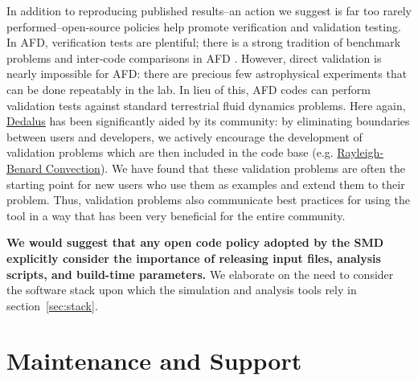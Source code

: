 \documentclass[12pt, titlepage]{aastex62}
\newcommand{\dedalus}{\href{http://dedalus-project.org}{Dedalus}}
\begin{document}

In addition to reproducing published results--an action we suggest is far too rarely performed--open-source policies help promote verification and validation testing. In AFD, verification tests are plentiful; there is a strong tradition of benchmark problems and inter-code comparisons in AFD \citep[e.g.][among many others]{2001JGR...106.3715B,2014GeoJI.197..119M,2014ApJS..210...14K,2016MNRAS.455.4274L}. However, direct validation is nearly impossible for AFD: there are precious few astrophysical experiments that can be done repeatably in the lab. In lieu of this, AFD codes can perform validation tests against standard terrestrial fluid dynamics problems. Here again, \dedalus{} has been significantly aided by its community: by eliminating boundaries between users and developers, we actively encourage the development of validation problems which are then included in the code base (e.g. \href{https://bitbucket.org/dedalus-project/dedalus/src/cf57edf1516b931bc4ad0a7895d06219bbe90414/examples/ivp/3d_rayleigh_benard/rayleigh_benard.py?at=default&fileviewer=file-view-default}{Rayleigh-Benard Convection}). We have found that these validation problems are often the starting point for new users who use them as examples and extend them to their problem. Thus, validation problems also communicate best practices for using the tool in a way that has been very beneficial for the entire community. 

\textbf{We would suggest that any open code policy adopted by the SMD explicitly consider the importance of releasing input files, analysis scripts, and build-time parameters.} We elaborate on the need to consider the software stack upon which the simulation and analysis tools rely in section~\ref{sec:stack}.


\section{Maintenance and Support}
\label{sec:support}
\end{document}
